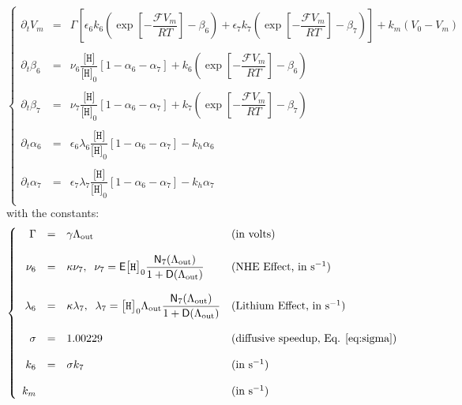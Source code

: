\documentclass[aps,onecolumn,11pt]{revtex4}
\newcommand{\mychem}[1]{\mathtt{#1}}
\newcommand{\myconc}[1]{\big[#1\big]}
\newcommand{\Faraday}{\mathcal{F}}
\newcommand{\spproton}{\mychem{H}}
\newcommand{\proton}{\myconc{\spproton}}
\newcommand{\myout}[1]{{#1}_{\mathrm{out}}}
\newcommand{\LiAll}{\Lambda}
\newcommand{\LiAllOut}{\myout{\LiAll}}
\begin{document}
\begin{equation}
\label{eq:full}
\left\lbrace
\begin{array}{rcl}
\partial_t V_m & = & \Gamma \left[ \epsilon_6 k_6 \left(\exp\left[ -\dfrac{\Faraday V_m}{RT} \right] - \beta_6\right) + \epsilon_7 k_7 \left(\exp\left[ -\dfrac{\Faraday V_m}{RT} \right] - \beta_7\right)\right] + k_m \left(V_0 - V_m\right)\\
\\
\partial_t \beta_6 & = & \nu_6 \dfrac{\proton}{\proton_0} \left[ 1-\alpha_6-\alpha_7\right] + k_6 \left(\exp\left[ -\dfrac{\Faraday V_m}{RT} \right] - \beta_6\right) \\
\\
\partial_t \beta_7 & = & \nu_7 \dfrac{\proton}{\proton_0} \left[ 1-\alpha_6-\alpha_7\right] + k_7 \left(\exp\left[ -\dfrac{\Faraday V_m}{RT} \right] - \beta_7\right) \\
\\
\partial_t \alpha_6 & = & \epsilon_6 \lambda_6  \dfrac{\proton}{\proton_0}\left[ 1-\alpha_6-\alpha_7\right] - k_h \alpha_6\\
\\
\partial_t \alpha_7 & = & \epsilon_7 \lambda_7  \dfrac{\proton}{\proton_0} \left[ 1-\alpha_6-\alpha_7\right] - k_h \alpha_7\\
\end{array}
\right.
\end{equation}
with the constants:
\begin{equation}
\left\lbrace
\begin{array}{rcll}
\Gamma & = & \gamma \LiAllOut & \text{(in volts)}\\
\\
\nu_6 & = & \kappa \nu_7, \;\; \nu_7  =  \mathsf{E}\proton_0 \dfrac{\mathsf{N}_7(\LiAllOut)}{1+\mathsf{D}(\LiAllOut)} & \text{(NHE Effect, in s$^{-1}$)}\\
\\
\lambda_6 & = & \kappa \lambda_7, \;\; \lambda_7  =  \proton_0 \LiAllOut \dfrac{\mathsf{N}_7(\LiAllOut)}{1+\mathsf{D}(\LiAllOut)} & \text{(Lithium Effect, in s$^{-1}$)}\\
\\
\sigma    & = & 1.00229 & \text{(diffusive speedup, Eq. \eqref{eq:sigma})}\\
\\
k_6 & = & \sigma k_7 & \text{(in s$^{-1}$)}\\
\\
k_m &  & & \text{(in s$^{-1}$)}\\
\end{array}
\right.
\end{equation}
\end{document}
